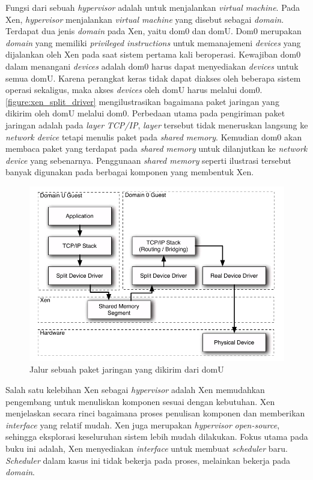 Fungsi dari sebuah \textit{hypervisor} adalah untuk menjalankan \textit{virtual machine}.  Pada
Xen, \textit{hypervisor} menjalankan \textit{virtual machine} yang disebut sebagai
\textit{domain}.  Terdapat dua jenis \textit{domain} pada Xen, yaitu dom0 dan domU.  Dom0
merupakan \textit{domain} yang memiliki \textit{privileged instructions} untuk memanajemeni
\textit{devices} yang dijalankan oleh Xen pada saat sistem pertama kali beroperasi.  Kewajiban
dom0 dalam menangani \textit{devices} adalah dom0 harus dapat menyediakan \textit{devices} untuk
semua domU.  Karena perangkat keras tidak dapat diakses oleh beberapa sistem operasi sekaligus,
maka akses \textit{devices} oleh domU harus melalui dom0.  \autoref{figure:xen_split_driver}
mengilustrasikan bagaimana paket jaringan yang dikirim oleh domU melalui dom0.  Perbedaan utama
pada pengiriman paket jaringan adalah pada \textit{layer} \textit{TCP/IP}, \textit{layer}
tersebut tidak meneruskan langsung ke \textit{network device} tetapi menulis paket pada
\textit{shared memory}.  Kemudian dom0 akan membaca paket yang terdapat pada \textit{shared
memory} untuk dilanjutkan ke \textit{network device} yang sebenarnya.  Penggunaan \textit{shared
memory} seperti ilustrasi tersebut banyak digunakan pada berbagai komponen yang membentuk Xen.

\begin{figure}[htbp]
    \includegraphics[scale=0.5]{./resources/xen-split-driver.png}
    \caption[Jalur sebuah paket jaringan yang dikirim dari domU]{Jalur sebuah paket jaringan yang dikirim dari domU \citep{Chisnall2014}}
    \label{figure:xen_split_driver}
\end{figure}

Salah satu kelebihan Xen sebagai \textit{hypervisor} adalah Xen memudahkan pengembang untuk
menuliskan komponen sesuai dengan kebutuhan.  Xen menjelaskan secara rinci bagaimana proses
penulisan komponen dan memberikan \textit{interface} yang relatif mudah.  Xen juga merupakan
\textit{hypervisor} \textit{open-source}, sehingga eksplorasi keseluruhan sistem lebih mudah
dilakukan.  Fokus utama pada buku ini adalah, Xen menyediakan \textit{interface} untuk membuat
\textit{scheduler} baru.  \textit{Scheduler} dalam kasus ini tidak bekerja pada proses,
melainkan bekerja pada \textit{domain}.

